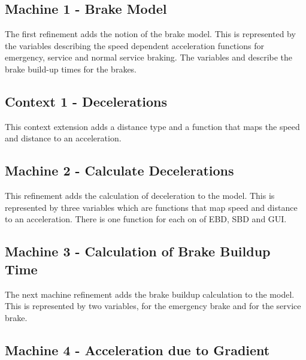\documentclass{template/openetcs_article}
\begin{document}
{\footnotesize

}

\subsection{Machine 1 - Brake Model}
\label{sec:machine-1-brake}

The first refinement adds the notion of the brake model. This is represented by
the variables describing the speed dependent acceleration functions for
emergency, service and normal service braking. The variables
 and  describe the brake
build-up times for the brakes.

{\footnotesize

}

\subsection{Context 1 - Decelerations}
\label{sec:cont-1-decel}

This context extension adds a distance type and a function that maps the speed
and distance to an acceleration.

{\footnotesize

}

\subsection{Machine 2 - Calculate Decelerations}
\label{sec:machine-2-calculate}

This refinement adds the calculation of deceleration to the model. This is
represented by three variables which are functions that map speed and distance
to an acceleration. There is one function for each on of EBD, SBD and GUI.

{\footnotesize

}

\subsection{Machine 3 - Calculation of Brake Buildup Time}
\label{sec:mach-3-calc}

The next machine refinement adds the brake buildup calculation to the
model. This is represented by two variables,  for the emergency
brake and  for the service brake.

{\footnotesize

}

\subsection{Machine 4 - Acceleration due to Gradient}
\label{sec:mach-4-accel}
\end{document}
